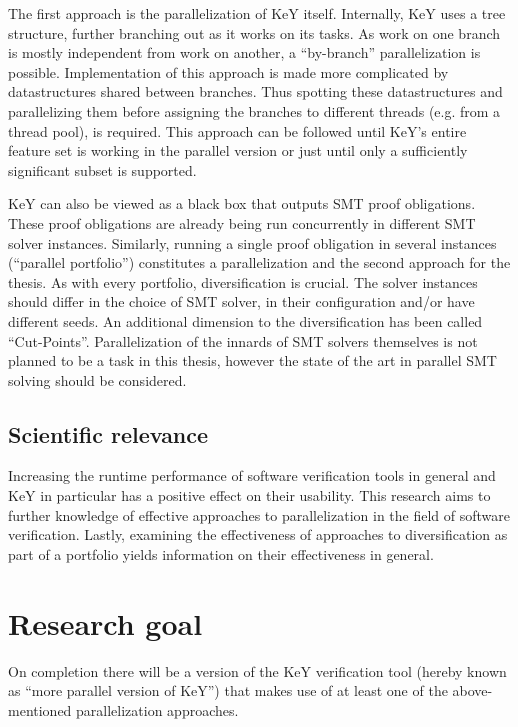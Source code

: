 \documentclass{scrartcl}
\begin{document}
The first approach is the parallelization of KeY itself.
Internally, KeY uses a tree structure, further branching out as it works on its tasks.
As work on one branch is mostly independent from work on another,
a \enquote{by-branch} parallelization is possible.
Implementation of this approach is made more complicated
by datastructures shared between branches.
Thus spotting these datastructures and parallelizing them
before assigning the branches to different threads (e.g. from a thread pool),
is required.
This approach can be followed until KeY's entire feature set
is working in the parallel version
or just until only a sufficiently significant subset is supported.

KeY can also be viewed as a black box that outputs SMT proof obligations.
These proof obligations are already being run concurrently in different SMT solver instances.
Similarly, running a single proof obligation in several instances (\enquote{parallel portfolio})
constitutes a parallelization and the second approach for the thesis.
As with every portfolio, diversification is crucial.
The solver instances should differ in the choice of SMT solver,
in their configuration and/or have different seeds.
An additional dimension to the diversification has been called \enquote{Cut-Points}.
Parallelization of the innards of SMT solvers themselves is not planned to be a task in this thesis,
however the state of the art in parallel SMT solving should be considered.

\subsection{Scientific relevance}
Increasing the runtime performance of software verification tools in general and KeY in particular
has a positive effect on their usability.
This research aims to further knowledge of effective approaches to parallelization
in the field of software verification.
Lastly, examining the effectiveness of approaches to diversification as part of a portfolio
yields information on their effectiveness in general.

\section{Research goal}
On completion there will be a version of the KeY verification tool
(hereby known as \enquote{more parallel version of KeY})
that makes use of at least one of the above-mentioned parallelization approaches.
\end{document}
